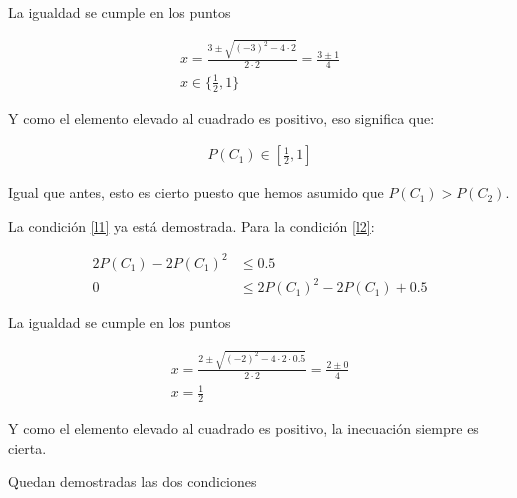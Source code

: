 \documentclass[a4paper]{article}
\begin{document}
\begin{enumerate}
{    La igualdad se cumple en los puntos

    \begin{align*}
        x = \frac
        {3 \pm \sqrt{(-3)^2 - 4\cdot2}}
        {2\cdot2}
        = \frac
        {3 \pm 1}
        {4} \\
        x \in \{\frac{1}{2}, 1\}
    \end{align*}

    Y como el elemento elevado al cuadrado es positivo, eso significa que:

    \begin{align*}
        P(C_1) \in [\frac{1}{2}, 1]
    \end{align*}

    Igual que antes, esto es cierto puesto que hemos asumido que $P(C_1) > P(C_2)$.

    La condición \ref{l1} ya está demostrada. Para la condición \ref{l2}:

    \begin{align*}
        2P(C_1) - 2P(C_1)^2 &\leq 0.5 \\
        0 &\leq 2P(C_1)^2 - 2P(C_1) + 0.5
    \end{align*}

    La igualdad se cumple en los puntos

    \begin{align*}
        x = \frac
        {2 \pm \sqrt{(-2)^2 - 4\cdot2\cdot0.5}}
        {2\cdot2}
        = \frac
        {2 \pm 0}
        {4} \\
        x =  \frac{1}{2}
    \end{align*}

    Y como el elemento elevado al cuadrado es positivo, la inecuación siempre es cierta.

    Quedan demostradas las dos condiciones






    }
  \end{enumerate}
\end{document}
